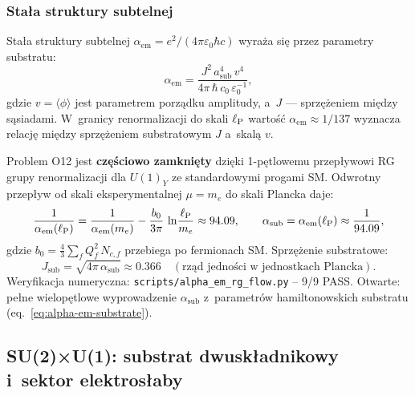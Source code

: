 \subsubsection{Stała struktury subtelnej}

\begin{proposition}%
\label{prop:alpha-em}
Stała struktury subtelnej $\alpha_{\mathrm{em}} = e^2/(4\pi\varepsilon_0\hbar c)$
wyraża się przez parametry substratu:
\begin{equation}\label{eq:alpha-em-substrate}
    \alpha_{\mathrm{em}}
    = \frac{J^2\,a_{\mathrm{sub}}^4\,v^4}
           {4\pi\,\hbar\,c_0\,\varepsilon_0^{-1}},
\end{equation}
gdzie $v = \langle\phi\rangle$ jest parametrem porządku amplitudy,
a~$J$ --- sprzężeniem między sąsiadami. W~granicy renormalizacji
do skali $\ell_{\mathrm{P}}$ wartość $\alpha_{\mathrm{em}} \approx 1/137$
wyznacza relację między sprzężeniem substratowym $J$ a~skalą $v$.
\end{proposition}

\begin{remark}%
\label{rem:O12-closed}
Problem O12 jest \textbf{częściowo zamknięty} dzięki 1-pętlowemu przepływowi
RG grupy renormalizacji dla $U(1)_Y$ ze standardowymi progami SM.
Odwrotny przepływ od skali eksperymentalnej $\mu = m_e$ do skali Plancka daje:
\begin{equation}\label{eq:alpha-Planck}
    \frac{1}{\alpha_{\mathrm{em}}(\ell_{\mathrm{P}})}
    = \frac{1}{\alpha_{\mathrm{em}}(m_e)}
      - \frac{b_0}{3\pi}\,\ln\!\frac{\ell_{\mathrm{P}}}{m_e}
    \approx 94.09,
    \qquad
    \alpha_{\mathrm{sub}} = \alpha_{\mathrm{em}}(\ell_{\mathrm{P}}) \approx \frac{1}{94.09},
\end{equation}
gdzie $b_0 = \tfrac{4}{3}\sum_f Q_f^2\,N_{c,f}$ przebiega po fermionach SM.
Sprzężenie substratowe:
\begin{equation}\label{eq:J-substrate-alpha}
    J_{\mathrm{sub}}
    = \sqrt{4\pi\,\alpha_{\mathrm{sub}}}
    \approx 0.366
    \quad (\text{rząd jedności w jednostkach Plancka}).
\end{equation}
Weryfikacja numeryczna: \texttt{scripts/alpha\_em\_rg\_flow.py} -- 9/9 PASS\@.
Otwarte: pełne wielopętlowe wyprowadzenie $\alpha_{\mathrm{sub}}$ z~parametrów
hamiltonowskich substratu (eq.~\eqref{eq:alpha-em-substrate}).
\end{remark}

\subsection{SU(2)×U(1): substrat dwuskładnikowy i~sektor
  elektrosłaby}\label{ssec:su2u1}\label{ssec:su2-su3}

